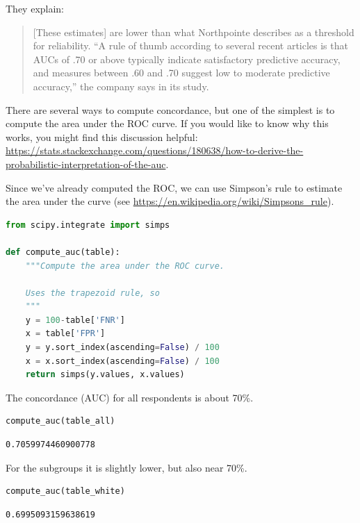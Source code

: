 They explain:

\begin{quote}
{[}These estimates{]} are lower than what Northpointe describes as a
threshold for reliability. ``A rule of thumb according to several recent
articles is that AUCs of .70 or above typically indicate satisfactory
predictive accuracy, and measures between .60 and .70 suggest low to
moderate predictive accuracy,'' the company says in its study.
\end{quote}

There are several ways to compute concordance, but one of the simplest
is to compute the area under the ROC curve. If you would like to know
why this works, you might find this discussion helpful:
\url{https://stats.stackexchange.com/questions/180638/how-to-derive-the-probabilistic-interpretation-of-the-auc}.

Since we've already computed the ROC, we can use Simpson's rule to
estimate the area under the curve (see
\url{https://en.wikipedia.org/wiki/Simpsons_rule}).

\begin{lstlisting}[language=Python]
from scipy.integrate import simps

def compute_auc(table):
    """Compute the area under the ROC curve.
    
    Uses the trapezoid rule, so 
    """
    y = 100-table['FNR']
    x = table['FPR']
    y = y.sort_index(ascending=False) / 100
    x = x.sort_index(ascending=False) / 100
    return simps(y.values, x.values)
\end{lstlisting}

The concordance (AUC) for all respondents is about 70\%.

\begin{lstlisting}[language=Python]
compute_auc(table_all)
\end{lstlisting}

\begin{lstlisting}[]
0.7059974460900778
\end{lstlisting}

For the subgroups it is slightly lower, but also near 70\%.

\begin{lstlisting}[language=Python]
compute_auc(table_white)
\end{lstlisting}

\begin{lstlisting}[]
0.6995093159638619
\end{lstlisting}

